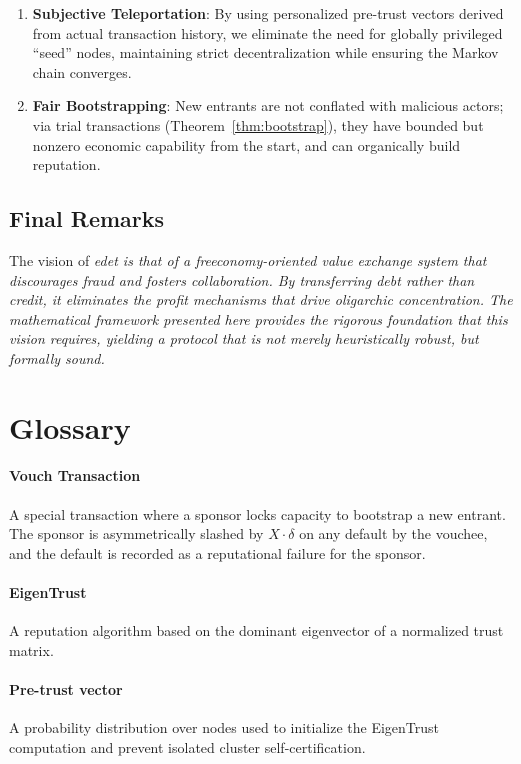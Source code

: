 \documentclass[11pt]{article}
\begin{document}
\begin{enumerate}
    \item \textbf{Subjective Teleportation}: By using personalized pre-trust vectors derived from actual transaction history, we eliminate the need for globally privileged ``seed'' nodes, maintaining strict decentralization while ensuring the Markov chain converges.
    \item \textbf{Fair Bootstrapping}: New entrants are not conflated with malicious actors; via trial transactions (Theorem~\ref{thm:bootstrap}), they have bounded but nonzero economic capability from the start, and can organically build reputation.
\end{enumerate}

\subsection{Final Remarks}

The vision of \em edet \em is that of a freeconomy-oriented value exchange system that discourages fraud and fosters collaboration. By transferring debt rather than credit, it eliminates the profit mechanisms that drive oligarchic concentration. The mathematical framework presented here provides the rigorous foundation that this vision requires, yielding a protocol that is not merely heuristically robust, but formally sound.

\section{Glossary}

\paragraph{Vouch Transaction} A special transaction where a sponsor locks capacity to bootstrap a new entrant. The sponsor is asymmetrically slashed by $X \cdot \delta$ on any default by the vouchee, and the default is recorded as a reputational failure for the sponsor.
\paragraph{EigenTrust} A reputation algorithm based on the dominant eigenvector of a normalized trust matrix.
\paragraph{Pre-trust vector} A probability distribution over nodes used to initialize the EigenTrust computation and prevent isolated cluster self-certification.
\end{document}
